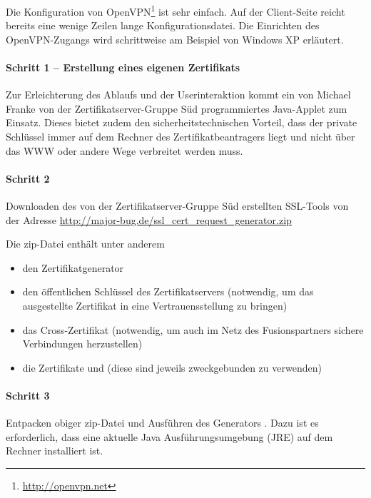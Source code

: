 Die Konfiguration von OpenVPN\footnote{\url{http://openvpn.net}} ist sehr
einfach. Auf der Client-Seite reicht bereits eine wenige Zeilen lange
Konfigurationsdatei. Die Einrichten des OpenVPN\hyp Zugangs wird schrittweise am
Beispiel von Windows XP erläutert.

\paragraph{Schritt 1 -- Erstellung eines eigenen Zertifikats}
Zur Erleichterung des Ablaufs und der Userinteraktion kommt ein von Michael
Franke von der Zertifikatserver-Gruppe Süd programmiertes Java-Applet zum
Einsatz. Dieses bietet zudem den sicherheitstechnischen Vorteil, dass der
private Schlüssel immer auf dem Rechner des Zertifikatbeantragers liegt und
nicht über das WWW oder andere Wege verbreitet werden muss.


\paragraph{Schritt 2}
Downloaden des von der Zertifikatserver-Gruppe Süd erstellten SSL-Tools von der
Adresse \url{http://major-bug.de/ssl_cert_request_generator.zip}

Die zip-Datei enthält unter anderem

\begin{itemize}
  \item den Zertifikatgenerator
  \item den öffentlichen Schlüssel  des
    Zertifikatservers (notwendig, um das ausgestellte Zertifikat in eine
    Vertrauensstellung zu bringen)
  \item das Cross-Zertifikat  (notwendig, um
    auch im Netz des Fusionspartners sichere Verbindungen herzustellen)
  \item die Zertifikate  und
      (diese sind jeweils zweckgebunden zu
    verwenden)
\end{itemize}

\paragraph{Schritt 3}

Entpacken obiger zip-Datei und Ausführen des Generators
.  Dazu ist es erforderlich, dass eine
aktuelle Java Ausführungsumgebung (JRE) auf dem Rechner installiert ist.


